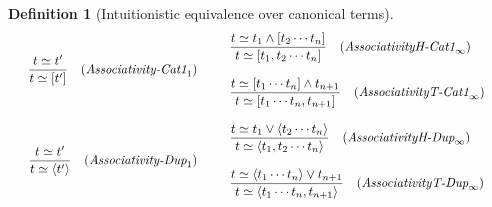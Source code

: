 \documentclass[12pt]{article}
\newtheorem{Definition}{Definition}[section]
\begin{document}
\begin{Definition}[Intuitionistic equivalence over canonical terms]
\begin{displaymath}
\begin{array}{c}
      \begin{array}{ll}
        \begin{array}{rl}
          \dfrac{ t \simeq t' }{ t \simeq [t'] }
          & (\text{\it Associativity-Cat1}_1)
        \end{array}
        & \begin{array}[c]{l}
            \begin{array}{rl}
              \dfrac{
                t \simeq t_1 \wedge [t_2 \cdots t_n ]
              }{
                t \simeq [t_1, t_2 \cdots t_n ]
              }  &  (\text{\it AssociativityH-Cat1}_\infty)
            \end{array}  \\
            \\
            \begin{array}{rl}
              \dfrac{
                t \simeq [t_1 \cdots t_n ] \wedge t_{n+1}
              }{
                t \simeq [t_1 \cdots t_n, t_{n+1} ]
              }  &  (\text{\it AssociativityT-Cat1}_\infty)
            \end{array}
          \end{array}
      \end{array}  \\
      \\
      
      \begin{array}{ll}
        \begin{array}{rl}
          \dfrac{ t \simeq t' }{ t \simeq \langle t' \rangle }
          & (\text{\it Associativity-Dup}_1)
        \end{array}
        & \begin{array}[c]{l}
            \begin{array}{rl}
              \dfrac{
                t \simeq t_1 \vee \langle t_2 \cdots t_n \rangle
              }{
                t \simeq \langle t_1, t_2 \cdots t_n \rangle
              }  &  (\text{\it AssociativityH-Dup}_\infty)
            \end{array}  \\
            \\
            \begin{array}{rl}
              \dfrac{
                t \simeq \langle t_1 \cdots t_n \rangle \vee t_{n+1}
              }{
                t \simeq \langle t_1 \cdots t_n, t_{n+1} \rangle
              }  &  (\text{\it AssociativityT-Dup}_\infty)
            \end{array}
          \end{array}
      \end{array}  \\
    \end{array}
  \end{displaymath}
  

\end{Definition}
\end{document}
